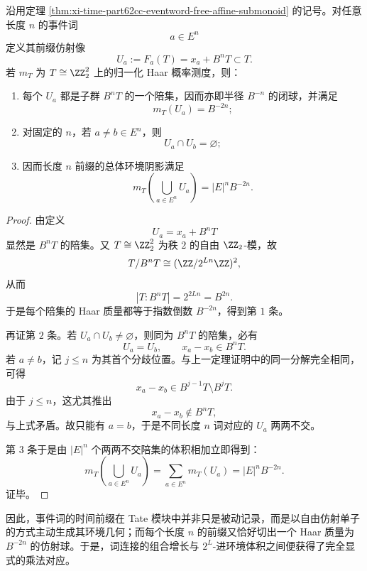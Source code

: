 \begin{corollary}\label{cor:xi-time-part62cc-prefix-affine-haar-volume}
沿用定理 \ref{thm:xi-time-part62cc-eventword-free-affine-submonoid} 的记号。对任意长度 \(n\) 的事件词
\[
a\in E^n
\]
定义其前缀仿射像
\[
U_a:=F_a(T)=x_a+B^nT\subset T.
\]
若 \(m_T\) 为 \(T\cong \ZZ_2^2\) 上的归一化 Haar 概率测度，则：
\begin{enumerate}
  \item 每个 \(U_a\) 都是子群 \(B^nT\) 的一个陪集，因而亦即半径 \(B^{-n}\) 的闭球，并满足
  \[
  m_T(U_a)=B^{-2n};
  \]
  \item 对固定的 \(n\)，若 \(a\neq b\in E^n\)，则
  \[
  U_a\cap U_b=\varnothing;
  \]
  \item 因而长度 \(n\) 前缀的总体环境阴影满足
  \[
  m_T\!\left(\bigcup_{a\in E^n}U_a\right)=|E|^n B^{-2n}.
  \]
\end{enumerate}
\end{corollary}
\begin{proof}
由定义
\[
U_a=x_a+B^nT
\]
显然是 \(B^nT\) 的陪集。又 \(T\cong \ZZ_2^2\) 为秩 \(2\) 的自由 \(\ZZ_2\)-模，故
\[
T/B^nT\cong (\ZZ/2^{Ln}\ZZ)^2,
\]
从而
\[
|T:B^nT|=2^{2Ln}=B^{2n}.
\]
于是每个陪集的 Haar 质量都等于指数倒数 \(B^{-2n}\)，得到第 \(1\) 条。

再证第 \(2\) 条。若 \(U_a\cap U_b\neq\varnothing\)，则同为 \(B^nT\) 的陪集，必有
\[
U_a=U_b,
\qquad
x_a-x_b\in B^nT.
\]
若 \(a\neq b\)，记 \(j\le n\) 为其首个分歧位置。与上一定理证明中的同一分解完全相同，可得
\[
x_a-x_b\in B^{j-1}T\setminus B^jT.
\]
由于 \(j\le n\)，这尤其推出
\[
x_a-x_b\notin B^nT,
\]
与上式矛盾。故只能有 \(a=b\)，于是不同长度 \(n\) 词对应的 \(U_a\) 两两不交。

第 \(3\) 条于是由 \(|E|^n\) 个两两不交陪集的体积相加立即得到：
\[
m_T\!\left(\bigcup_{a\in E^n}U_a\right)
=
\sum_{a\in E^n}m_T(U_a)
=
|E|^n B^{-2n}.
\]
证毕。
\end{proof}

\noindent
因此，事件词的时间前缀在 Tate 模块中并非只是被动记录，而是以自由仿射单子的方式主动生成其环境几何；而每个长度 \(n\) 的前缀又恰好切出一个 Haar 质量为 \(B^{-2n}\) 的仿射球。于是，词连接的组合增长与 \(2^L\)-进环境体积之间便获得了完全显式的乘法对应。

\endinput

